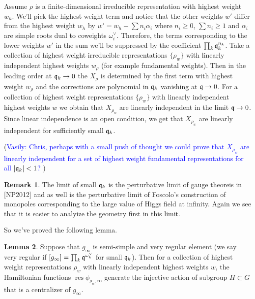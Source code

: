 \documentclass[11pt, oneside, reqno]{amsart}
\theoremstyle{definition} \newtheorem{definition}{Definition}[section]
\newtheorem{lemma}[definition]{Lemma}
\theoremstyle{definition} \newtheorem{remark}[definition]{Remark}
\theoremstyle{definition} \newtheorem{remarks}[definition]{Remarks}
\theoremstyle{definition} \newtheorem{question}[definition]{Question}
\theoremstyle{definition} \newtheorem*{note}{Note}
\theoremstyle{definition} \newtheorem{example}[definition]{Example}
\theoremstyle{definition} \newtheorem{examples}[definition]{Examples}
\DeclareMathOperator{\res}{res}
\newcommand{\vasily}[1]{(\textcolor{blue}{Vasily: #1})}
\begin{document}
Assume $\rho$ is a finite-dimensional irreducible representation with highest weight $w_h$.
  We'll pick the highest weight term and notice that the other weights $w'$
  differ from the highest weight $w_{h}$ by $w' = w_{h} - \sum {n_i \alpha_i} $ where $n_i \geq 0$,
  $\sum n_i \geq 1$ and $\alpha_i$ are simple roots dual to coweights $\omega_i^{\vee}$.
  Therefore, the terms corresponding to the lower weights $w'$
  in the sum we'll be suppressed by the coefficient $ \prod_{k} \mathfrak{q}_k^{n_k}$.
  Take a collection of highest weight irreducible representations $\{\rho_{w}\}$
  with linearly independent highest weights $w_{\rho}$ (for example fundamental weights). Then in the leading order at $\mathfrak{q}_k \to 0$ the $X_{\rho}$ is determined by the first term
  with highest weight $w_{\rho}$ and the corrections are polynomial in $\mathfrak{q}_k$
  vanishing at $\mathfrak{q} \to 0$. For a collection of highest weight representations $\{ \rho_{w} \}$ 
  with linearly independent highest weights $w$ we obtain that $X_{\rho_{w}}$ are linearly
  independent in the limit $\mathfrak{q} \to 0$.  Since linear independence is
  an open condition, we get that $X_{\rho_w}$ are linearly independent
  for sufficiently small $\mathfrak{q}_k$.

  \vasily{Chris, perhaps with a small push of thought we could prove that $X_{\rho_w}$
    are linearly independent for a set of highest weight fundamental representations
    for all $|\mathfrak{q}_k| < 1$? }

\begin{remark}
  The limit of small $\mathfrak{q}_k$ is the perturbative limit of gauge theoreis in [NP2012]
  and as well is the perturbative limit of Foscolo's construction of monopoles
  corresponding to the large value of Higgs field at infinity. Again
  we see that it is easier to analyize the geometry first in this limit. 
\end{remark}

So we've proved the following lemma.
\begin{lemma}
  Suppose that $g_\infty$ is semi-simple and very regular element
  (we say very regular if $[g_\infty] = \prod_{k} \mathfrak{q}^{\omega_k^{\vee}}$ for small $\mathfrak{q}_k$).
  Then for a collection of highest weight representations $\rho_w$ with
  linearly independent highest weights $w$, the Hamiltonian functions
  $\res \phi_{\rho_w, \infty}$ generate the injective action of subgroup $H \subset G$
  that is a centralizer of $g_\infty$. 
\end{lemma}
\end{document}
